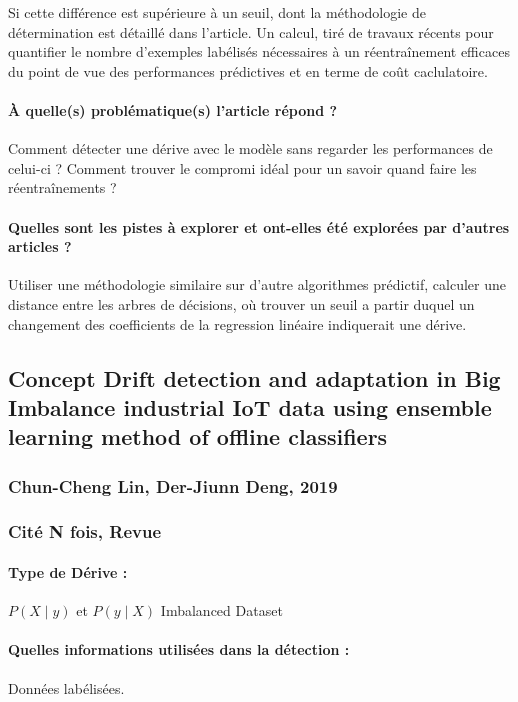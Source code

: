 \documentclass[11pt,a4paper]{report}
\begin{document}
Si cette différence est supérieure à un seuil, dont la méthodologie de détermination est détaillé dans l'article. Un calcul, tiré de travaux récents pour quantifier le nombre d'exemples labélisés nécessaires à un réentraînement efficaces du point de vue des performances prédictives et en terme de coût caclulatoire.

\paragraph{À quelle(s) problématique(s) l'article répond ?} Comment détecter une dérive avec le modèle sans regarder les performances de celui-ci ? Comment trouver le compromi idéal pour un savoir quand faire les réentraînements ?

\paragraph{Quelles sont les pistes à explorer et ont-elles  été explorées par d'autres articles ?} Utiliser une méthodologie similaire sur d'autre algorithmes prédictif, calculer une distance entre les arbres de décisions, où trouver un seuil a partir duquel un changement des coefficients de la regression linéaire indiquerait une dérive.






\subsection{Concept Drift detection and adaptation in Big Imbalance industrial IoT data using ensemble learning method of offline classifiers}
\subsubsection{Chun-Cheng Lin, Der-Jiunn Deng, 2019}

\subsubsection{Cité N fois, Revue}

\paragraph{Type de Dérive :} $P(X\mid y)$ et $P(y \mid X)$ Imbalanced Dataset
\paragraph{Quelles informations utilisées dans la détection :} Données labélisées.
\end{document}
